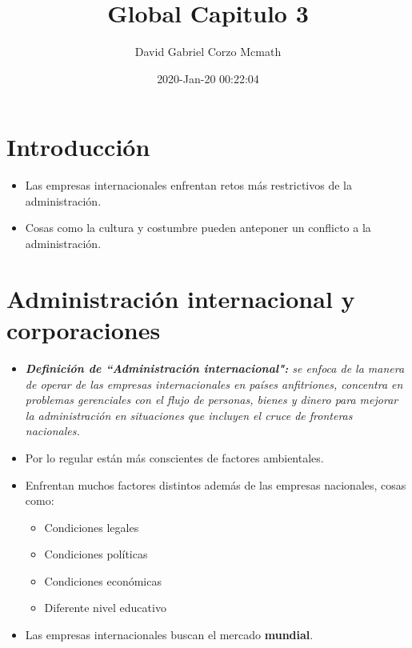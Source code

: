 \documentclass{article}
\title{Global Capitulo 3}
\author{David Gabriel Corzo Mcmath}
\date{2020-Jan-20 00:22:04}
\begin{document}
\maketitle


\section{Introducción}
\begin{itemize}
    \item Las empresas internacionales enfrentan retos más restrictivos de la administración.
    \item Cosas como la cultura y costumbre pueden anteponer un conflicto a la administración.
\end{itemize}

\section{Administración internacional y corporaciones}
\begin{itemize}
    \item \emph{\textbf{Definición de ``Administración internacional":} se enfoca de la manera de operar de las empresas internacionales en países anfitriones, concentra en problemas gerenciales con el flujo de personas, bienes y dinero para mejorar la administración en situaciones que incluyen el cruce de fronteras nacionales.}
    \item Por lo regular están más conscientes de factores ambientales.
    \item Enfrentan muchos factores distintos además de las empresas nacionales, cosas como:
        \begin{itemize}
            \item Condiciones legales 
            \item Condiciones políticas 
            \item Condiciones económicas 
            \item Diferente nivel educativo
        \end{itemize}
    
    \item Las empresas internacionales buscan el mercado \textbf{mundial}.
\end{itemize}
\end{document}
